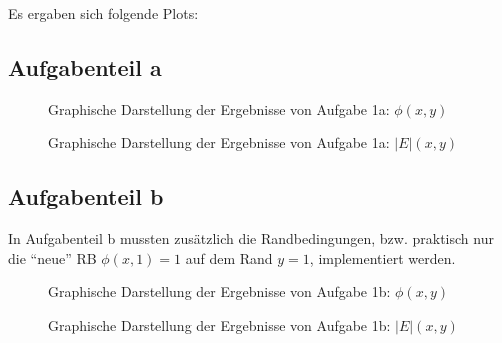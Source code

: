 Es ergaben sich folgende Plots:

\subsection*{Aufgabenteil a}

\begin{landscape}
	\begin{figure}
		\caption{Graphische Darstellung der Ergebnisse von Aufgabe 1a: $\phi(x,y)$}
		\label{fig:aPhi}
	\end{figure}
\end{landscape} 

\begin{landscape}
	\begin{figure}
		\caption{Graphische Darstellung der Ergebnisse von Aufgabe 1a: $|E|(x,y)$}
		\label{fig:aabsE}
	\end{figure}
\end{landscape} 


\subsection*{Aufgabenteil b}
In Aufgabenteil b mussten zusätzlich die Randbedingungen, bzw. praktisch nur die \enquote{neue} RB $\phi(x,1)=1$ auf dem Rand $y=1$, implementiert werden.

\begin{landscape}
	\begin{figure}
		\caption{Graphische Darstellung der Ergebnisse von Aufgabe 1b: $\phi(x,y)$}
		\label{fig:bPhi}
	\end{figure}
\end{landscape} 

\begin{landscape}
	\begin{figure}
		\caption{Graphische Darstellung der Ergebnisse von Aufgabe 1b: $|E|(x,y)$}
		\label{fig:babsE}
	\end{figure}
\end{landscape} 

